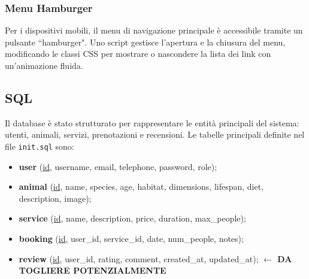 \subsubsection{Menu Hamburger}
Per i dispositivi mobili, il menu di navigazione principale è accessibile tramite un pulsante ``hamburger". Uno script gestisce l'apertura e la chiusura del menu, modificando le classi CSS per mostrare o nascondere la lista dei link con un'animazione fluida.

\subsection{SQL}
Il database è stato strutturato per rappresentare le entità principali del sistema: utenti, animali, servizi, prenotazioni e recensioni. Le tabelle principali definite nel file \texttt{init.sql} sono:
\begin{itemize}
    \item \textbf{user} (\underline{id}, username, email, telephone, password, role);
    \item \textbf{animal} (\underline{id}, name, species, age, habitat, dimensions, lifespan, diet, description, image);
    \item \textbf{service} (\underline{id}, name, description, price, duration, max\_people);
    \item \textbf{booking} (\underline{id}, user\_id, service\_id, date, num\_people, notes);
    \item \textbf{review} (\underline{id}, user\_id, rating, comment, created\_at, updated\_at);  \textbf{$\leftarrow$ DA TOGLIERE POTENZIALMENTE}
\end{itemize}

